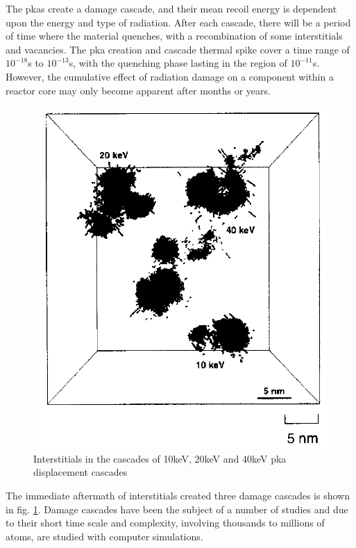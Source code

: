 The \acrshort{pka}s create a damage cascade, and their mean recoil energy is dependent upon the energy and type of radiation.  After each cascade, there will be a period of time where the material quenches, with a recombination of some interstitials and vacancies.  The \acrshort{pka} creation and cascade thermal spike cover a time range of $10^{-18}$s to $10^{-13}$s, with the quenching phase lasting in the region of $10^{-11}$s.  However, the cumulative effect of radiation damage on a component within a reactor core may only become apparent after months or years.

\begin{figure}
  \begin{center}
    \includegraphics[width=.4\linewidth]{chapters/consequences_of_ionizing_radiation/images/stoller1996damage.png}
    \caption{Interstitials in the cascades of 10keV, 20keV and 40keV \acrshort{pka} displacement cascades \cite{stollerdamage1996}}
    \label{fig:stollerdamage}
  \end{center}
\end{figure}

The immediate aftermath of interstitials created three damage cascades is shown in fig. \ref{fig:stollerdamage}\cite{stollerdamage1996}.  Damage cascades have been the subject of a number of studies and due to their short time scale and complexity, involving thousands to millions of atoms, are studied with computer simulations.



